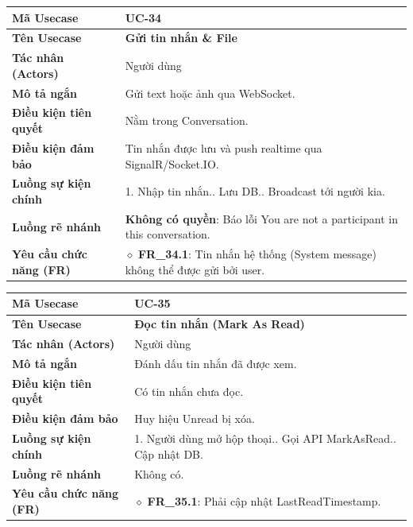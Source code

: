 \begin{table}[H]
\renewcommand{\arraystretch}{1.3}
\centering
\begin{tabularx}{\textwidth}{|p{4.5cm}|X|}
\hline
\cellcolor{gray!15}\bfseries Mã Usecase & \textbf{UC-34} \\ \hline
\cellcolor{gray!15}\bfseries Tên Usecase & \textbf{Gửi tin nhắn \& File} \\ \hline
\cellcolor{gray!15}\bfseries Tác nhân (Actors) & Người dùng \\ \hline
\cellcolor{gray!15}\bfseries Mô tả ngắn & Gửi text hoặc ảnh qua WebSocket. \\ \hline
\cellcolor{gray!15}\bfseries Điều kiện tiên quyết & Nằm trong Conversation. \\ \hline
\cellcolor{gray!15}\bfseries Điều kiện đảm bảo & Tin nhắn được lưu và push realtime qua SignalR/Socket.IO. \\ \hline
\cellcolor{gray!15}\bfseries Luồng sự kiện chính & 1. Nhập tin nhắn.\newline 2. Lưu DB.\newline 3. Broadcast tới người kia. \\ \hline
\cellcolor{gray!15}\bfseries Luồng rẽ nhánh & \textbf{Không có quyền}: Báo lỗi You are not a participant in this conversation. \\ \hline
\cellcolor{gray!15}\bfseries Yêu cầu chức năng (FR) & $\diamond$ \textbf{FR\_34.1}: Tin nhắn hệ thống (System message) không thể được gửi bởi user. \\ \hline
\end{tabularx}
\end{table}

\begin{table}[H]
\renewcommand{\arraystretch}{1.3}
\centering
\begin{tabularx}{\textwidth}{|p{4.5cm}|X|}
\hline
\cellcolor{gray!15}\bfseries Mã Usecase & \textbf{UC-35} \\ \hline
\cellcolor{gray!15}\bfseries Tên Usecase & \textbf{Đọc tin nhắn (Mark As Read)} \\ \hline
\cellcolor{gray!15}\bfseries Tác nhân (Actors) & Người dùng \\ \hline
\cellcolor{gray!15}\bfseries Mô tả ngắn & Đánh dấu tin nhắn đã được xem. \\ \hline
\cellcolor{gray!15}\bfseries Điều kiện tiên quyết & Có tin nhắn chưa đọc. \\ \hline
\cellcolor{gray!15}\bfseries Điều kiện đảm bảo & Huy hiệu Unread bị xóa. \\ \hline
\cellcolor{gray!15}\bfseries Luồng sự kiện chính & 1. Người dùng mở hộp thoại.\newline 2. Gọi API MarkAsRead.\newline 3. Cập nhật DB. \\ \hline
\cellcolor{gray!15}\bfseries Luồng rẽ nhánh & Không có. \\ \hline
\cellcolor{gray!15}\bfseries Yêu cầu chức năng (FR) & $\diamond$ \textbf{FR\_35.1}: Phải cập nhật LastReadTimestamp. \\ \hline
\end{tabularx}
\end{table}

